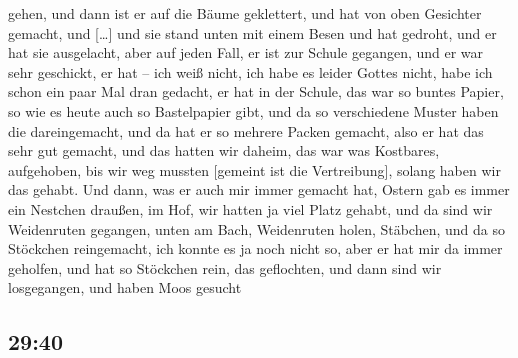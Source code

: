 \documentclass[ngerman,]{article}
\begin{document}
\begin{multicols}{3}
\begin{description}
gehen, und dann ist er auf die Bäume geklettert, und hat von oben
Gesichter gemacht, und {[}\ldots{}{]} und sie stand unten mit einem
Besen und hat gedroht, und er hat sie ausgelacht, aber auf jeden Fall,
er ist zur Schule gegangen, und er war sehr geschickt, er hat – ich weiß
nicht, ich habe es leider Gottes nicht, habe ich schon ein paar Mal dran
gedacht, er hat in der Schule, das war so buntes Papier, so wie es heute
auch so Bastelpapier gibt, und da so verschiedene Muster haben die
dareingemacht, und da hat er so mehrere Packen gemacht, also er hat das
sehr gut gemacht, und das hatten wir daheim, das war was Kostbares,
aufgehoben, bis wir weg mussten {[}gemeint ist die Vertreibung{]},
solang haben wir das gehabt. Und dann, was er auch mir immer gemacht
hat, Ostern gab es immer ein Nestchen draußen, im Hof, wir hatten ja
viel Platz gehabt, und da sind wir Weidenruten gegangen, unten am Bach,
Weidenruten holen, Stäbchen, und da so Stöckchen reingemacht, ich konnte
es ja noch nicht so, aber er hat mir da immer geholfen, und hat so
Stöckchen rein, das geflochten, und dann sind wir losgegangen, und haben
Moos gesucht
\end{description}

\hypertarget{section-1}{%
\subsection{29:40}\label{section-1}}


\end{multicols}
\end{document}
